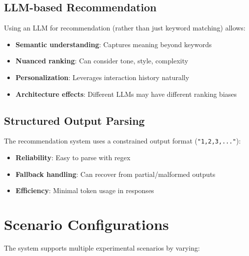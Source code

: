 \documentclass[11pt]{article}
\begin{document}
\subsection{LLM-based Recommendation}

Using an LLM for recommendation (rather than just keyword matching) allows:
\begin{itemize}
    \item \textbf{Semantic understanding}: Captures meaning beyond keywords
    \item \textbf{Nuanced ranking}: Can consider tone, style, complexity
    \item \textbf{Personalization}: Leverages interaction history naturally
    \item \textbf{Architecture effects}: Different LLMs may have different ranking biases
\end{itemize}

\subsection{Structured Output Parsing}

The recommendation system uses a constrained output format (\texttt{"1,2,3,..."}):
\begin{itemize}
    \item \textbf{Reliability}: Easy to parse with regex
    \item \textbf{Fallback handling}: Can recover from partial/malformed outputs
    \item \textbf{Efficiency}: Minimal token usage in responses
\end{itemize}

\section{Scenario Configurations}

The system supports multiple experimental scenarios by varying:
\end{document}
